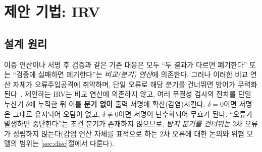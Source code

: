 \section{제안 기법: IRV}
\label{sec:irv}

\subsection{설계 원리}
이중 연산이나 서명 후 검증과 같은 기존 대응은 모두 ``두 결과가 다르면 폐기한다'' 또는 ``검증에
실패하면 폐기한다''는 \emph{비교(분기) 연산}에 의존한다. 그러나 이러한 비교 연산 자체가
오류주입공격에 취약하며, 단일 오류로 해당 분기를 건너뛰면 방어가 무력화된다~\cite{yen2000}. 제안하는
IRV는 비교 연산에 의존하지 않고, 여러 무결성 검사의 잔차를 단일 누산기 $\delta$에 누적한 뒤
이를 \textbf{분기 없이} 출력 서명에 확산(감염)시킨다. $\delta=0$이면 서명은 그대로 유지되어
오탐이 없고, $\delta\neq0$이면 서명이 난수화되어 무효가 된다. ``오류가 발생하면 중단한다''는 조건
분기가 존재하지 않으므로, \emph{탐지 분기를 건너뛰는} 2차 오류가 성립하지 않는다(감염 연산 자체를
표적으로 하는 2차 오류에 대한 논의와 위협 모델의 범위는 \ref{sec:disc}절에서 다룬다).

